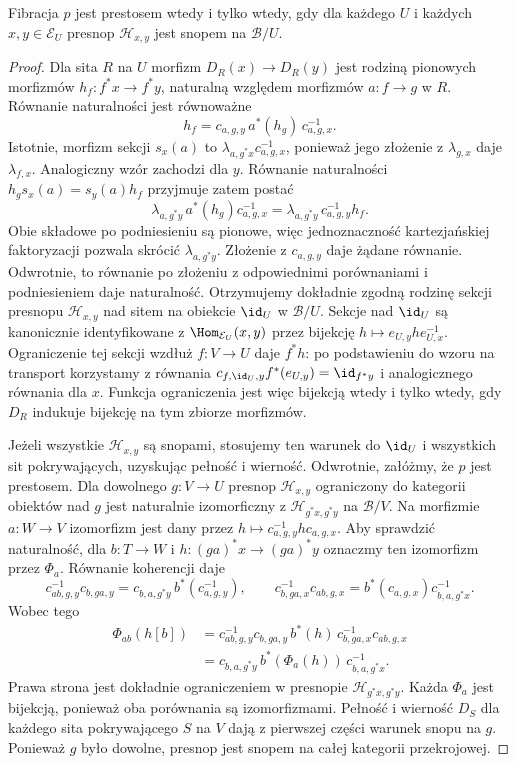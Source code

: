 \begin{twierdzenie}\label{cat:thm:prestack-hom-sheaf}
Fibracja $p$ jest prestosem wtedy i tylko wtedy, gdy dla każdego $U$ i każdych $x,y\in\mathcal E_U$ presnop $\mathcal H_{x,y}$ jest snopem na $\mathcal B/U$.
\end{twierdzenie}
\begin{proof}
Dla sita $R$ na $U$ morfizm $D_R(x)\to D_R(y)$ jest rodziną pionowych morfizmów $h_f:f^*x\to f^*y$, naturalną względem morfizmów $a:f\to g$ w $R$. Równanie naturalności jest równoważne
\[
 h_f=c_{a,g,y}\,a^*(h_g)\,c_{a,g,x}^{-1}.
\]
Istotnie, morfizm sekcji $s_x(a)$ to $\lambda_{a,g^*x}c_{a,g,x}^{-1}$, ponieważ jego złożenie z $\lambda_{g,x}$ daje $\lambda_{f,x}$. Analogiczny wzór zachodzi dla $y$. Równanie naturalności $h_gs_x(a)=s_y(a)h_f$ przyjmuje zatem postać
\[
 \lambda_{a,g^*y}\,a^*(h_g)c_{a,g,x}^{-1}
 =\lambda_{a,g^*y}\,c_{a,g,y}^{-1}h_f.
\]
Obie składowe po podniesieniu są pionowe, więc jednoznaczność kartezjańskiej faktoryzacji pozwala skrócić $\lambda_{a,g^*y}$. Złożenie z $c_{a,g,y}$ daje żądane równanie. Odwrotnie, to równanie po złożeniu z odpowiednimi porównaniami i podniesieniem daje naturalność. Otrzymujemy dokładnie zgodną rodzinę sekcji presnopu $\mathcal H_{x,y}$ nad sitem na obiekcie $\id_U$ w $\mathcal B/U$. Sekcje nad $\id_U$ są kanonicznie identyfikowane z $\Hom_{\mathcal E_U}(x,y)$ przez bijekcję $h\mapsto e_{U,y}h e_{U,x}^{-1}$. Ograniczenie tej sekcji wzdłuż $f:V\to U$ daje $f^*h$: po podstawieniu do wzoru na transport korzystamy z równania $c_{f,\id_U,y}f^*(e_{U,y})=\id_{f^*y}$ i analogicznego równania dla $x$. Funkcja ograniczenia jest więc bijekcją wtedy i tylko wtedy, gdy $D_R$ indukuje bijekcję na tym zbiorze morfizmów.

Jeżeli wszystkie $\mathcal H_{x,y}$ są snopami, stosujemy ten warunek do $\id_U$ i wszystkich sit pokrywających, uzyskując pełność i wierność. Odwrotnie, załóżmy, że $p$ jest prestosem. Dla dowolnego $g:V\to U$ presnop $\mathcal H_{x,y}$ ograniczony do kategorii obiektów nad $g$ jest naturalnie izomorficzny z $\mathcal H_{g^*x,g^*y}$ na $\mathcal B/V$. Na morfizmie $a:W\to V$ izomorfizm jest dany przez $h\mapsto c_{a,g,y}^{-1}h c_{a,g,x}$. Aby sprawdzić naturalność, dla $b:T\to W$ i $h:(ga)^*x\to(ga)^*y$ oznaczmy ten izomorfizm przez $\Phi_a$. Równanie koherencji daje
\[
 c_{ab,g,y}^{-1}c_{b,ga,y}
 =c_{b,a,g^*y}\,b^*(c_{a,g,y}^{-1}),
 \qquad
 c_{b,ga,x}^{-1}c_{ab,g,x}
 =b^*(c_{a,g,x})c_{b,a,g^*x}^{-1}.
\]
Wobec tego
\[
\begin{aligned}
 \Phi_{ab}(h[b])
 &=c_{ab,g,y}^{-1}c_{b,ga,y}\,b^*(h)\,
       c_{b,ga,x}^{-1}c_{ab,g,x}\\
 &=c_{b,a,g^*y}\,b^*(\Phi_a(h))\,c_{b,a,g^*x}^{-1}.
\end{aligned}
\]
Prawa strona jest dokładnie ograniczeniem w presnopie $\mathcal H_{g^*x,g^*y}$. Każda $\Phi_a$ jest bijekcją, ponieważ oba porównania są izomorfizmami. Pełność i wierność $D_S$ dla każdego sita pokrywającego $S$ na $V$ dają z pierwszej części warunek snopu na $g$. Ponieważ $g$ było dowolne, presnop jest snopem na całej kategorii przekrojowej.
\end{proof}

